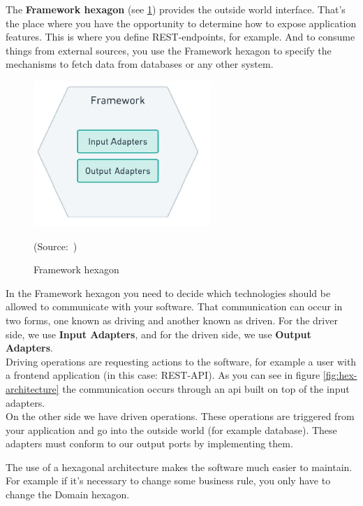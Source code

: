         The \textbf{Framework hexagon} (see \ref{fig:framework-hexagon}) provides the outside world interface. That's the place where you have the opportunity to determine how to expose application features. This is where you define REST-endpoints, for example. And to consume things from external sources, you use the Framework hexagon to specify the mechanisms to fetch data from databases or any other system. 
        
        \begin{figure}[h]
            \centering
            \includegraphics{images/framework-hexagon.png}
            \caption{Framework hexagon}
            \mbox{(Source: \autocite[][p.19]{hexagonal_architecture})}
            \label{fig:framework-hexagon}
        \end{figure}

        In the Framework hexagon you need to decide which technologies should be allowed to communicate with your software. That communication can occur in two forms, one known as driving
        and another known as driven. For the driver side, we use \textbf{Input Adapters}, and for the driven side, we use \textbf{Output Adapters}. \\
        Driving operations are requesting actions to the software, for example a user with a frontend application (in this case: REST-API). As you can see in figure \ref{fig:hex-architecture} the communication occurs through an \ac{api} built on top of the input adapters. \\
        On the other side we have driven operations. These operations are triggered from your application and go into the outside world (for example database). These adapters must conform to our output ports by implementing them.
        
        The use of a hexagonal architecture makes the software much easier to maintain. For example if it's necessary to change some business rule, you only have to change the Domain hexagon.
        \newpage

